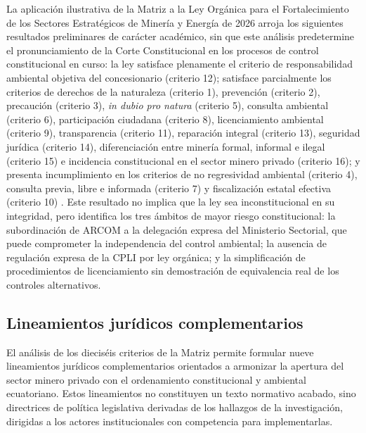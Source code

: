 La aplicación ilustrativa de la Matriz a la Ley Orgánica para el Fortalecimiento de los Sectores Estratégicos de Minería y Energía de 2026 arroja los siguientes resultados preliminares de carácter académico, sin que este análisis predetermine el pronunciamiento de la Corte Constitucional en los procesos de control constitucional en curso: la ley satisface plenamente el criterio de responsabilidad ambiental objetiva del concesionario (criterio 12); satisface parcialmente los criterios de derechos de la naturaleza (criterio 1), prevención (criterio 2), precaución (criterio 3), \textit{in dubio pro natura} (criterio 5), consulta ambiental (criterio 6), participación ciudadana (criterio 8), licenciamiento ambiental (criterio 9), transparencia (criterio 11), reparación integral (criterio 13), seguridad jurídica (criterio 14), diferenciación entre minería formal, informal e ilegal (criterio 15) e incidencia constitucional en el sector minero privado (criterio 16); y presenta incumplimiento en los criterios de no regresividad ambiental (criterio 4), consulta previa, libre e informada (criterio 7) y fiscalización estatal efectiva (criterio 10) \parencite{ley_fortalecimiento_2026,sanchez_romero_et_al_2026,condoy_viera_2025}. Este resultado no implica que la ley sea inconstitucional en su integridad, pero identifica los tres ámbitos de mayor riesgo constitucional: la subordinación de ARCOM a la delegación expresa del Ministerio Sectorial, que puede comprometer la independencia del control ambiental; la ausencia de regulación expresa de la CPLI por ley orgánica; y la simplificación de procedimientos de licenciamiento sin demostración de equivalencia real de los controles alternativos.

\subsection{Lineamientos jurídicos complementarios}

El análisis de los dieciséis criterios de la Matriz permite formular nueve lineamientos jurídicos complementarios orientados a armonizar la apertura del sector minero privado con el ordenamiento constitucional y ambiental ecuatoriano. Estos lineamientos no constituyen un texto normativo acabado, sino directrices de política legislativa derivadas de los hallazgos de la investigación, dirigidas a los actores institucionales con competencia para implementarlas.

